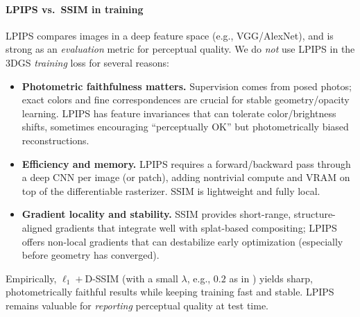 \begin{enrichment}
\begin{enrichment}
\begin{enrichment}
        \paragraph{LPIPS vs.\ SSIM in training}
        LPIPS \cite{zhang2018_lpips} compares images in a deep feature space (e.g., VGG/AlexNet), and is strong as an \emph{evaluation} metric for perceptual quality. We do \emph{not} use LPIPS in the 3DGS \emph{training} loss for several reasons:
        \begin{itemize}
            \item \textbf{Photometric faithfulness matters.} Supervision comes from posed photos; exact colors and fine correspondences are crucial for stable geometry/opacity learning. LPIPS has feature invariances that can tolerate color/brightness shifts, sometimes encouraging “perceptually OK” but photometrically biased reconstructions.
            \item \textbf{Efficiency and memory.} LPIPS requires a forward/backward pass through a deep CNN per image (or patch), adding nontrivial compute and VRAM on top of the differentiable rasterizer. SSIM is lightweight and fully local.
            \item \textbf{Gradient locality and stability.} SSIM provides short-range, structure-aligned gradients that integrate well with splat-based compositing; LPIPS offers non-local gradients that can destabilize early optimization (especially before geometry has converged).
        \end{itemize}
        Empirically, $\ell_1{+}$D-SSIM (with a small $\lambda$, e.g., $0.2$ as in \cite{kerbl2023_3dgaussiansplatting}) yields sharp, photometrically faithful results while keeping training fast and stable. LPIPS remains valuable for \emph{reporting} perceptual quality at test time.
        

\end{enrichment}
\end{enrichment}
\end{enrichment}
